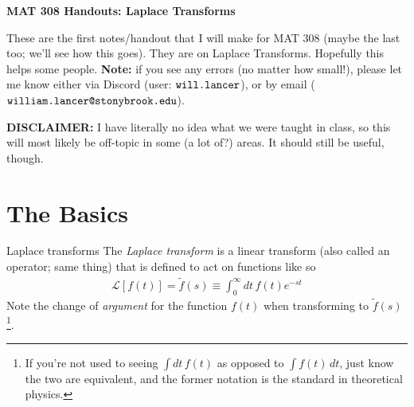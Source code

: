 \documentclass[11pt]{article}
\newcommand{\bigtitle}[1]{
    \begin{center}
    \huge \textbf{#1}
    \end{center}
}
\theoremstyle{mystyle}
\begin{document}
\bigtitle{MAT 308 Handouts: Laplace Transforms}

\noin
These are the first notes/handout that I will make for
MAT 308 (maybe the last too; we'll see how this goes).
They are on Laplace Transforms. Hopefully this helps
some people.
\textbf{Note:} if you see any errors (no
matter how small!), please let me know either via Discord
(user: $\verb|will.lancer|$), or by email ($\verb|william.lancer@stonybrook.edu|$).

\noin
\textbf{DISCLAIMER:} I have literally no idea what we
were taught in class, so this will most likely be off-topic
in some (a lot of?) areas. It should still be useful, though.

\section{The Basics}

\begin{psidea}{Laplace transforms}{}
    The \emph{Laplace transform} is a linear transform (also
    called an operator; same thing)
    that is defined to act on functions like so
    \begin{align*}
        \mathcal{L}[f(t)] = \tilde{f}(s) \equiv \int_0^\infty dt \, f(t) e^{-st}
    \end{align*}
    Note the change of \emph{argument} for the function $f(t)$
    when transforming to $\tilde{f}(s)$\footnote{If you're
    not used to seeing $\int dt \, f(t)$ as opposed
    to $\int f(t) \, dt$, just know the two are equivalent,
    and the former notation is the standard in theoretical
    physics.}.
\end{psidea}
\end{document}
